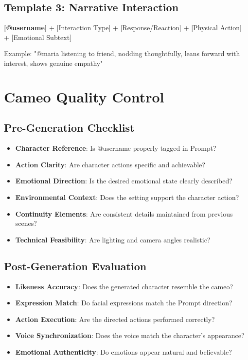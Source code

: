 \subsection*{Template 3: Narrative Interaction}
\begin{Prompt}
\textbf{[@username]} + [Interaction Type] + [Response/Reaction] + [Physical Action] + [Emotional Subtext]

Example: "@maria listening to friend, nodding thoughtfully, leans forward with interest, shows genuine empathy"
\end{Prompt}

\section*{Cameo Quality Control}

\subsection*{Pre-Generation Checklist}
\begin{itemize}
\item[$\square$] \textbf{Character Reference}: Is @username properly tagged in Prompt?
\item[$\square$] \textbf{Action Clarity}: Are character actions specific and achievable?
\item[$\square$] \textbf{Emotional Direction}: Is the desired emotional state clearly described?
\item[$\square$] \textbf{Environmental Context}: Does the setting support the character action?
\item[$\square$] \textbf{Continuity Elements}: Are consistent details maintained from previous scenes?
\item[$\square$] \textbf{Technical Feasibility}: Are lighting and camera angles realistic?
\end{itemize}

\subsection*{Post-Generation Evaluation}
\begin{itemize}
\item[$\square$] \textbf{Likeness Accuracy}: Does the generated character resemble the cameo?
\item[$\square$] \textbf{Expression Match}: Do facial expressions match the Prompt direction?
\item[$\square$] \textbf{Action Execution}: Are the directed actions performed correctly?
\item[$\square$] \textbf{Voice Synchronization}: Does the voice match the character's appearance?
\item[$\square$] \textbf{Emotional Authenticity}: Do emotions appear natural and believable?
\end{itemize}

